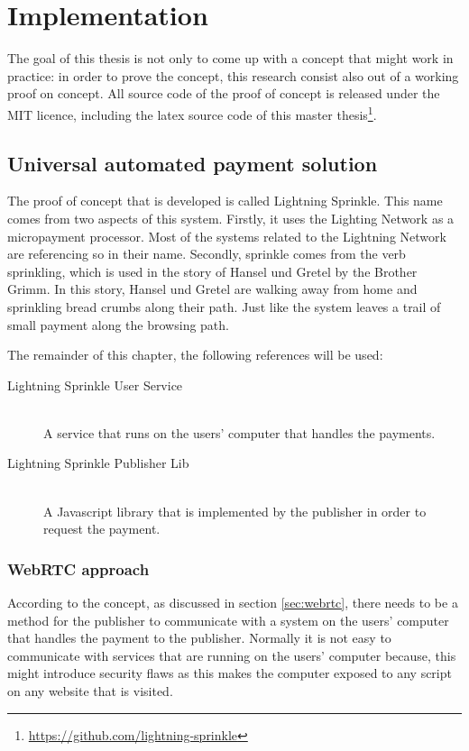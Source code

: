 \chapter{Implementation}
\label{cha:implementation}

The goal of this thesis is not only to come up with a concept that might work in practice: in order to prove the concept, this research consist also out of a working proof on concept. All source code of the proof of concept is released under the MIT licence, including the latex source code of this master thesis\footnote{\url{https://github.com/lightning-sprinkle}}.

\section{Universal automated payment solution}
The proof of concept that is developed is called Lightning Sprinkle. This name comes from two aspects of this system. Firstly, it uses the Lighting Network as a micropayment processor. Most of the systems related to the Lightning Network are referencing so in their name. Secondly, sprinkle comes from the verb sprinkling, which is used in the story of Hansel und Gretel by the Brother Grimm. In this story, Hansel und Gretel are walking away from home and sprinkling bread crumbs along their path. Just like the system leaves a trail of small payment along the browsing path. 

The remainder of this chapter, the following references will be used:

\begin{description}
  \item[Lightning Sprinkle User Service] \hfill \\ A service that runs on the users' computer that handles the payments.
  \item[Lightning Sprinkle Publisher Lib] \hfill \\ A Javascript library that is implemented by the publisher in order to request the payment.
\end{description} 

\subsection{WebRTC approach}
According to the concept, as discussed in section \ref{sec:webrtc}, there needs to be a method for the publisher to communicate with a system on the users' computer that handles the payment to the publisher. Normally it is not easy to communicate with services that are running on the users' computer because, this might introduce security flaws as this makes the computer exposed to any script on any website that is visited. 

